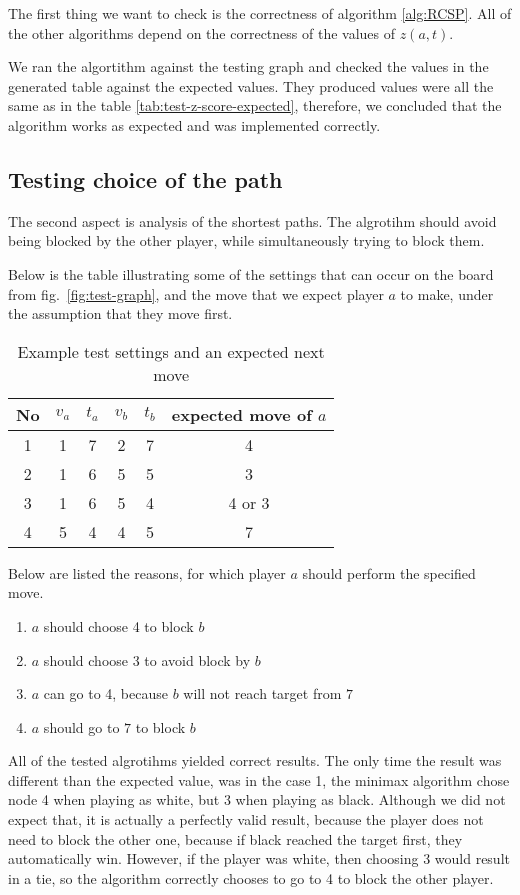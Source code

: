 \documentclass[12pt]{article}
\begin{document}
The first thing we want to check is the correctness of algorithm \ref{alg:RCSP}.
All of the other algorithms depend on the correctness of the values of $z(a,t)$.

We ran the algortithm against the testing graph and checked the values in the generated table against the expected values.
They produced values were all the same as in the table \ref{tab:test-z-score-expected},
therefore, we concluded that the algorithm works as expected and was implemented correctly.

\subsection{Testing choice of the path}

The second aspect is analysis of the shortest paths.
The algrotihm should avoid being blocked by the other player,
while simultaneously trying to block them.

Below is the table illustrating some of the settings that can occur on the board from fig.~\ref{fig:test-graph},
and the move that we expect player $a$ to make, under the assumption that they move first.

\begin{table}[h]\centering
    \begin{tabular}{c|cccc|c}
        \toprule
        No & $v_a$ & $t_a$ & $v_b$ & $t_b$ & expected move of $a$ \\ \midrule
        1  & 1     & 7     & 2     & 7     & 4                    \\
        2  & 1     & 6     & 5     & 5     & 3                    \\
        3  & 1     & 6     & 5     & 4     & 4 or 3               \\
        4  & 5     & 4     & 4     & 5     & 7                    \\
        \bottomrule
    \end{tabular}
    \caption{Example test settings and an expected next move}
\end{table}

Below are listed the reasons, for which player $a$ should perform the specified move.
\begin{enumerate}
    \item $a$ should choose 4 to block $b$
    \item $a$ should choose 3 to avoid block by $b$
    \item $a$ can go to 4, because $b$ will not reach target from $7$
    \item $a$ should go to $7$ to block $b$
\end{enumerate}

All of the tested algrotihms yielded correct results.
The only time the result was different than the expected value, was in the case 1,
the minimax algorithm chose node 4 when playing as white, but 3 when playing as black.
Although we did not expect that, it is actually a perfectly valid result,
because the player does not need to block the other one,
because if black reached the target first, they automatically win.
However, if the player was white, then choosing 3 would result in a tie, so the algorithm correctly chooses to go to 4 to block the other player.
\end{document}
